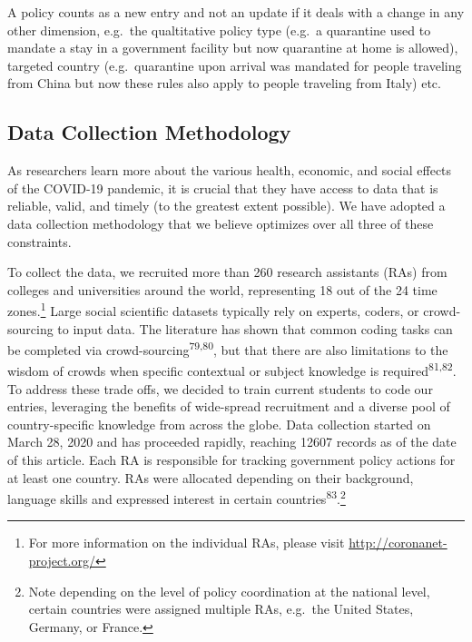 \documentclass[]{article}
\let\rmarkdownfootnote\footnote%
\def\footnote{\protect\rmarkdownfootnote}
\begin{document}
A policy counts as a new entry and not an update if it deals with a change in any other dimension, e.g.~the qualtitative policy type (e.g.~a quarantine used to mandate a stay in a government facility but now quarantine at home is allowed), targeted country (e.g.~quarantine upon arrival was mandated for people traveling from China but now these rules also apply to people traveling from Italy) etc.

\hypertarget{data-collection-methodology}{%
\subsection*{Data Collection Methodology}\label{data-collection-methodology}}

As researchers learn more about the various health, economic, and social effects of the COVID-19 pandemic, it is crucial that they have access to data that is reliable, valid, and timely (to the greatest extent possible). We have adopted a data collection methodology that we believe optimizes over all three of these constraints.

To collect the data, we recruited more than 260 research assistants (RAs) from colleges and universities around the world, representing 18 out of the 24 time zones.\footnote{For more information on the individual RAs, please visit \url{http://coronanet-project.org/}} Large social scientific datasets typically rely on experts, coders, or crowd-sourcing to input data. The literature has shown that common coding tasks can be completed via crowd-sourcing\textsuperscript{79,80}, but that there are also limitations to the wisdom of crowds when specific contextual or subject knowledge is required\textsuperscript{81,82}. To address these trade offs, we decided to train current students to code our entries, leveraging the benefits of wide-spread recruitment and a diverse pool of country-specific knowledge from across the globe. Data collection started on March 28, 2020 and has proceeded rapidly, reaching 12607 records as of the date of this article. Each RA is responsible for tracking government policy actions for at least one country. RAs were allocated depending on their background, language skills and expressed interest in certain countries\textsuperscript{83}.\footnote{Note depending on the level of policy coordination at the national level, certain countries were assigned multiple RAs, e.g.~the United States, Germany, or France.}
\end{document}
